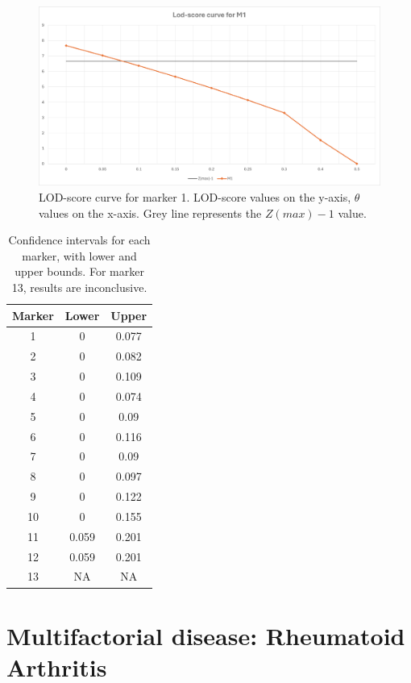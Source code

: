 \documentclass[a4paper,12pt]{article}
\begin{document}
\begin{figure}[ht] %
    \centering
    \includegraphics[width=\textwidth]{images/Lod-score_curve_M1.png}
    \caption{LOD-score curve for marker 1. LOD-score values on the y-axis, $\theta$ values on the x-axis. 
    Grey line represents the $\mathit{Z(max)-1}$ value.}  
    \label{fig:lod_curve} 
    
\end{figure}

\begin{table}[ht]
    \centering
    \begin{tabular}{ccc}
        \toprule
        \textbf{Marker} & \textbf{Lower} & \textbf{Upper} \\ 
        \midrule
        1 & 0 & 0.077 \\ 
        2 & 0 & 0.082 \\ 
        3 & 0 & 0.109 \\ 
        4 & 0 & 0.074 \\ 
        5 & 0 & 0.09 \\ 
        6 & 0 & 0.116 \\ 
        7 & 0 & 0.09 \\ 
        8 & 0 & 0.097 \\ 
        9 & 0 & 0.122 \\ 
        10 & 0 & 0.155 \\ 
        11 & 0.059 & 0.201 \\ 
        12 & 0.059 & 0.201 \\ 
        13 & NA & NA \\ 
        \bottomrule
    \end{tabular}
    \caption{Confidence intervals for each marker, with lower and upper bounds. For marker 13, results are inconclusive.}
    \label{tab:ci_bounds}
\end{table}


\newpage
    \section{Multifactorial disease: Rheumatoid Arthritis}
\end{document}
